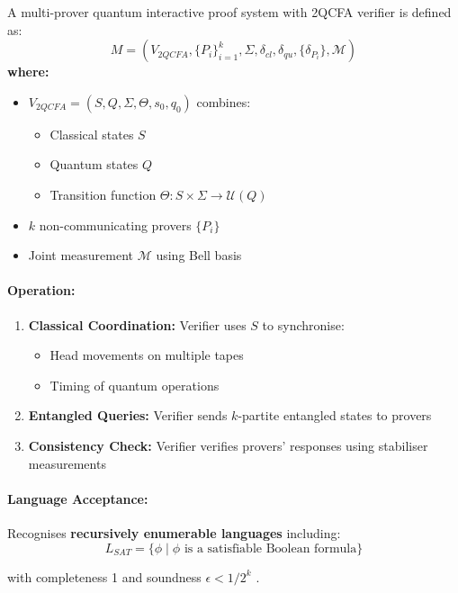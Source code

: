 \begin{definition}
A multi-prover quantum interactive proof system with 2QCFA verifier is defined as:
\[
M = (V_{2QCFA}, \{P_i\}_{i=1}^k, \Sigma, \delta_{cl}, \delta_{qu}, \{\delta_{P_i}\}, \mathcal{M})
\]
\textbf{where:}
\begin{itemize}
    \item $V_{2QCFA} = (S, Q, \Sigma, \Theta, s_0, q_0)$ combines:
    \begin{itemize}
        \item Classical states $S$
        \item Quantum states $Q$
        \item Transition function $\Theta: S \times \Sigma \rightarrow \mathcal{U}(Q)$
    \end{itemize}
    \item $k$ non-communicating provers $\{P_i\}$
    \item Joint measurement $\mathcal{M}$ using Bell basis
\end{itemize}
\end{definition}

\paragraph{Operation:}
\begin{enumerate}
    \item \textbf{Classical Coordination:} Verifier uses $S$ to synchronise:
    \begin{itemize}
        \item Head movements on multiple tapes
        \item Timing of quantum operations
    \end{itemize}
    \item \textbf{Entangled Queries:} Verifier sends $k$-partite entangled states to provers
    \item \textbf{Consistency Check:} Verifier verifies provers' responses using stabiliser measurements
\end{enumerate}

\paragraph{Language Acceptance:}
Recognises \textbf{recursively enumerable languages} including:
\[
L_{SAT} = \{\phi \mid \phi \text{ is a satisfiable Boolean formula}\}
\]

with completeness 1 and soundness $\epsilon < 1/2^k$ \cite{kobayashi2003quantum}.

